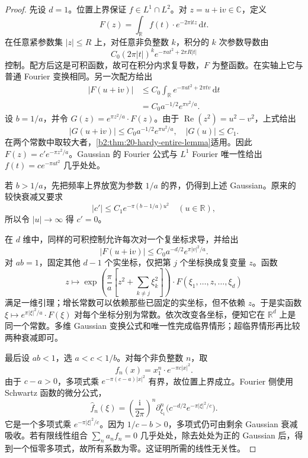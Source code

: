 \begin{proof}
先设 \(d=1\)。位置上界保证 \(f\in L^1\cap L^2\)。对 \(z=u+\mathrm iv\in\mathbb C\)，定义
\[
 F(z)=\int_{\mathbb R}f(t)\cdot e^{-2\pi\mathrm i tz}\,\mathrm dt.
\]
在任意紧参数集 \(|z|\leq R\) 上，对任意非负整数 \(k\)，积分的 \(k\) 次参数导数由
\[
 C_0(2\pi|t|)^k e^{-\pi at^2+2\pi R|t|}
\]
控制。配方后这是可积函数，故可在积分内求复导数，\(F\) 为整函数。在实轴上它与普通 Fourier 变换相同。另一次配方给出
\[
 \begin{aligned}
 |F(u+\mathrm iv)|
 &\leq C_0\int_{\mathbb R}e^{-\pi at^2+2\pi tv}\,\mathrm dt\\
 &=C_0a^{-1/2}e^{\pi v^2/a}.
 \end{aligned}
\]
设 \(b=1/a\)，并令 \(G(z)=e^{\pi z^2/a}\cdot F(z)\)。由于 \(\operatorname{Re}(z^2)=u^2-v^2\)，上式给出
\[
 |G(u+\mathrm iv)|\leq C_0a^{-1/2}e^{\pi u^2/a},
 \quad |G(u)|\leq C_1.
\]
在两个常数中取较大者，\cref{b2:thm:20-hardy-entire-lemma}适用。因此 \(F(z)=c'e^{-\pi z^2/a}\)。Gaussian 的 Fourier 公式与 \(L^1\) Fourier 唯一性给出 \(f(t)=c e^{-\pi at^2}\) 几乎处处。

若 \(b>1/a\)，先把频率上界放宽为参数 \(1/a\) 的界，仍得到上述 Gaussian。原来的较快衰减又要求
\[
 |c'|\leq C_1e^{-\pi(b-1/a)u^2}\quad(u\in\mathbb R),
\]
所以令 \(|u|\to\infty\) 得 \(c'=0\)。

在 \(d\) 维中，同样的可积控制允许每次对一个复坐标求导，并给出
\[
 |F(u+\mathrm iv)|\leq C_0a^{-d/2}e^{\pi|v|^2/a}.
\]
对 \(ab=1\)，固定其他 \(d-1\) 个实坐标，仅把第 \(j\) 个坐标换成复变量 \(z\)。函数
\[
 z\longmapsto
 \exp\left(\frac\pi a\left[z^2+\sum_{k\ne j}\xi_k^2\right]\right)
 \cdot F(\xi_1,\ldots,z,\ldots,\xi_d)
\]
满足一维引理；增长常数可以依赖那些已固定的实坐标，但不依赖 \(z\)。于是实函数
\(\xi\mapsto e^{\pi|\xi|^2/a}\cdot F(\xi)\)
对每个坐标分别为常数。依次改变各坐标，便知它在 \(\mathbb R^d\) 上是同一个常数。多维 Gaussian 变换公式和唯一性完成临界情形；超临界情形再比较两种衰减即可。

最后设 \(ab<1\)，选 \(a<c<1/b\)。对每个非负整数 \(n\)，取
\[
 f_n(x)=x_1^n\cdot e^{-\pi c|x|^2}.
\]
由于 \(c-a>0\)，多项式乘 \(e^{-\pi(c-a)|x|^2}\) 有界，故位置上界成立。Fourier 侧使用 Schwartz 函数的微分公式，
\[
 \widehat f_n(\xi)
 =\left(\frac{\mathrm i}{2\pi}\right)^n
   \partial_{\xi_1}^n\bigl(c^{-d/2}e^{-\pi|\xi|^2/c}\bigr).
\]
它是一个多项式乘 \(e^{-\pi|\xi|^2/c}\)。因为 \(1/c-b>0\)，多项式仍可由剩余 Gaussian 衰减吸收。若有限线性组合 \(\sum_n a_nf_n=0\) 几乎处处，除去处处为正的 Gaussian 后，得到一个恒零多项式，故所有系数为零。这证明所需的线性无关性。
\end{proof}

